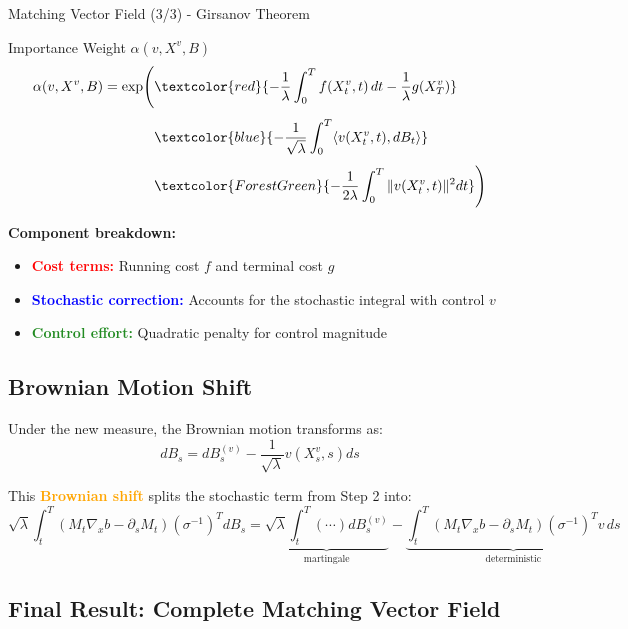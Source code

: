 \documentclass[aspectratio=169,xcolor=dvipsnames]{beamer}
\begin{document}
\begin{frame}[allowframebreaks]{Matching Vector Field (3/3) - Girsanov Theorem}
    \begin{alertblock}{Importance Weight $\alpha(v, X^v, B)$}
        \begin{equation}
        \begin{aligned}
        \alpha(v, X^v, B) = \exp\!\Bigg(
        &\textcolor{red}{- \frac{1}{\lambda}\int_0^T f(X_t^v, t)\, dt - \frac{1}{\lambda} g(X_T^v)} \\[4pt]
        &\textcolor{blue}{- \frac{1}{\sqrt{\lambda}} \int_0^T \langle v(X_t^v, t), dB_t \rangle} \\[4pt]
        &\textcolor{ForestGreen}{- \frac{1}{2\lambda} \int_0^T \| v(X_t^v, t) \|^2 dt}
        \Bigg)
        \end{aligned}
        \end{equation}
    \end{alertblock}
    
    \textbf{Component breakdown:}
    \begin{itemize}
        \item \textcolor{red}{\textbf{Cost terms:}} Running cost $f$ and terminal cost $g$
        \item \textcolor{blue}{\textbf{Stochastic correction:}} Accounts for the stochastic integral with control $v$
        \item \textcolor{ForestGreen}{\textbf{Control effort:}} Quadratic penalty for control magnitude
    \end{itemize}
    
    \vspace{0.8cm}
    
    \subsection*{Brownian Motion Shift}
    
    Under the new measure, the Brownian motion transforms as:
    $$dB_s = dB_s^{(v)} - \frac{1}{\sqrt{\lambda}} v(X_s^v, s) ds$$
    
    This \textcolor{orange}{\textbf{Brownian shift}} splits the stochastic term from Step 2 into:
    $$\sqrt{\lambda} \int_t^T (M_t\nabla_x b - \partial_s M_t)(\sigma^{-1})^T dB_s = \underbrace{\sqrt{\lambda} \int_t^T (\cdots) dB_s^{(v)}}_{\text{martingale}} - \underbrace{\int_t^T (M_t\nabla_x b - \partial_s M_t)(\sigma^{-1})^T v \, ds}_{\text{deterministic}}$$
    
    \vspace{0.8cm}
    
    \subsection*{Final Result: Complete Matching Vector Field}
    

\end{frame}
\end{document}
